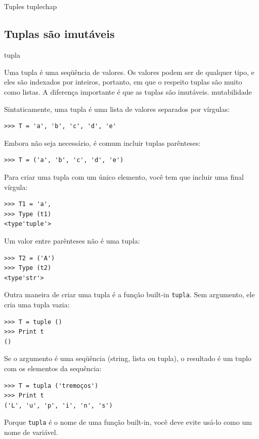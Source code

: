 \documentclass[10pt]{book}
\begin{document}
\begin{exercise}
\begin{v erbatim}
\chapter{} Tuples
\label{} tuplechap

\section{Tuplas são imutáveis}
\index{} tupla

Uma tupla é uma seqüência de valores. Os valores podem ser de qualquer tipo, e
eles são indexados por inteiros, portanto, em que o respeito tuplas são muito
como listas. A diferença importante é que as tuplas são imutáveis.
\index{} mutabilidade

Sintaticamente, uma tupla é uma lista de valores separados por vírgulas:

\begin{verbatim}
>>> T = 'a', 'b', 'c', 'd', 'e'
\end{verbatim}
%
Embora não seja necessário, é comum incluir tuplas
parênteses:

\begin{verbatim}
>>> T = ('a', 'b', 'c', 'd', 'e')
\end{verbatim}
%
Para criar uma tupla com um único elemento, você tem que incluir uma final
vírgula:

\begin{verbatim}
>>> T1 = 'a',
>>> Type (t1)
<type'tuple'>
\end{verbatim}
%
Um valor entre parênteses não é uma tupla:

\begin{verbatim}
>>> T2 = ('A')
>>> Type (t2)
<type'str'>
\end{verbatim}
%
Outra maneira de criar uma tupla é a função built-in {\tt tupla}.
Sem argumento, ele cria uma tupla vazia:

\begin{verbatim}
>>> T = tuple ()
>>> Print t
()
\end{verbatim}
%
Se o argumento é uma seqüência (string, lista ou tupla), o resultado
é um tuplo com os elementos da sequência:

\begin{verbatim}
>>> T = tupla ('tremoços')
>>> Print t
('L', 'u', 'p', 'i', 'n', 's')
\end{verbatim}
%
Porque {\tt tupla} é o nome de uma função built-in, você deve
evite usá-lo como um nome de variável.


\end{v erbatim}
\end{exercise}
\end{document}
